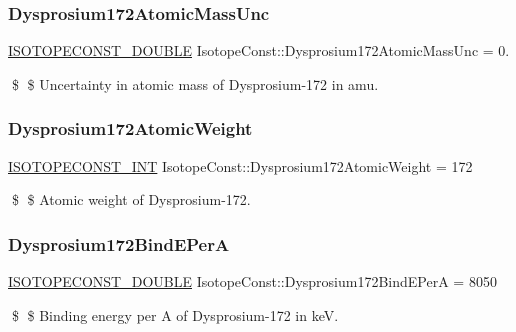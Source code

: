 \subsubsection{\texorpdfstring{Dysprosium172\+Atomic\+Mass\+Unc}{Dysprosium172AtomicMassUnc}}
{\footnotesize\ttfamily \mbox{\hyperlink{group___isotope_const-_macros_ga8f45a7272ce02c0b4c65c44636ed719a}{I\+S\+O\+T\+O\+P\+E\+C\+O\+N\+S\+T\+\_\+\+D\+O\+U\+B\+LE}} Isotope\+Const\+::\+Dysprosium172\+Atomic\+Mass\+Unc = 0.}

\$ \$ Uncertainty in atomic mass of Dysprosium-\/172 in amu. \mbox{\label{group___isotope_const-_dysprosium-_dy172_ga29f92cfae0c339e5fb28865f8fd8be80}} 
\subsubsection{\texorpdfstring{Dysprosium172\+Atomic\+Weight}{Dysprosium172AtomicWeight}}
{\footnotesize\ttfamily \mbox{\hyperlink{group___isotope_const-_macros_ga5f18360b3e99483a35c32d789e62621c}{I\+S\+O\+T\+O\+P\+E\+C\+O\+N\+S\+T\+\_\+\+I\+NT}} Isotope\+Const\+::\+Dysprosium172\+Atomic\+Weight = 172}

\$ \$ Atomic weight of Dysprosium-\/172. \mbox{\label{group___isotope_const-_dysprosium-_dy172_gab36f29eebe45de3bbccb5871337c6f1c}} 
\subsubsection{\texorpdfstring{Dysprosium172\+Bind\+E\+PerA}{Dysprosium172BindEPerA}}
{\footnotesize\ttfamily \mbox{\hyperlink{group___isotope_const-_macros_ga8f45a7272ce02c0b4c65c44636ed719a}{I\+S\+O\+T\+O\+P\+E\+C\+O\+N\+S\+T\+\_\+\+D\+O\+U\+B\+LE}} Isotope\+Const\+::\+Dysprosium172\+Bind\+E\+PerA = 8050}

\$ \$ Binding energy per A of Dysprosium-\/172 in keV. \mbox{\label{group___isotope_const-_dysprosium-_dy172_gab65bb072ade7ec651f685cd088580650}} 
